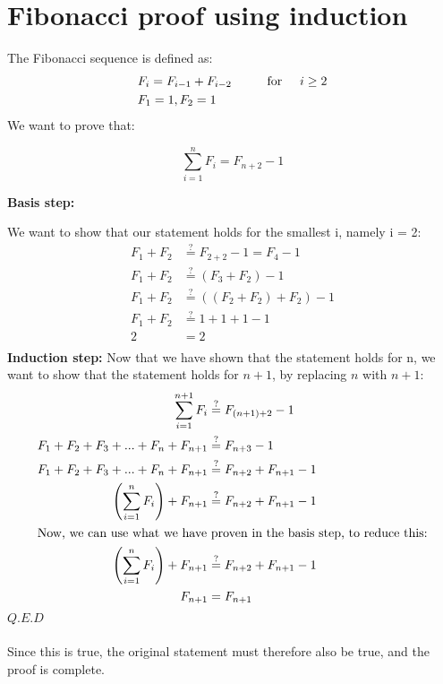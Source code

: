 
\section{Fibonacci proof using induction}\label{induction_proof}

The Fibonacci sequence is defined as:
\begin{align}
	&F_i = F_{i-1} + F_{i-2} \hspace{10mm} \text{for} \hspace{5 mm} i \geq 2\\
	&F_1 = 1 , F_2 = 1
\end{align}
We want to prove that:

\begin{equation}
\sum\limits_{i=1}^n F_i = F_{n+2} - 1
\end{equation}

\textbf{Basis step:}

We want to show that our statement holds for the smallest i, namely i = 2:
\begin{align}
F_1 + F_2 &\stackrel{?}{=} F_{2 + 2} - 1 = F_4 - 1\\
F_1 + F_2 &\stackrel{?}{=} (F_3 + F_2) -1\\
F_1 + F_2 &\stackrel{?}{=} ((F_2 + F_2) + F_2) - 1\\
F_1 + F_2 &\stackrel{?}{=} 1 + 1 + 1 -1 \\
2 &= 2\\
\end{align}
\textbf{Induction step:}
Now that we have shown that the statement holds for n, we want to show that the statement holds for $n+1$, by replacing $n$ with $n+1$:
\begin{align}
\sum\limits_{i=1}^{n+1} F_{i} &\stackrel{?}{=} F_{(n + 1)+2} - 1\\
F_1 + F_2 + F_3 + ... + F_n + F_{n+1} &\stackrel{?}{=} F_{n + 3} -1\\
F_1 + F_2 + F_3 + ... + F_n + F_{n+1} &\stackrel{?}{=} F_{n + 2} + F_{n + 1} -1\\
\left(\sum\limits_{i=1}^n F_{i} \right) + F_{n+1} &\stackrel{?}{=} F_{n + 2} + F_{n + 1} -1\\
\intertext{Now, we can use what we have proven in the basis step, to reduce this:}
\left( \sum\limits_{i=1}^n F_{i} \right) + F_{n+1} &\stackrel{?}{=} F_{n + 2} + F_{n + 1} -1\\
F_{n+1} &= F_{n + 1}
\end{align}
\hspace{120mm} $Q.E.D$\\\\
Since this is true, the original statement must therefore also be true, and the proof is complete.
